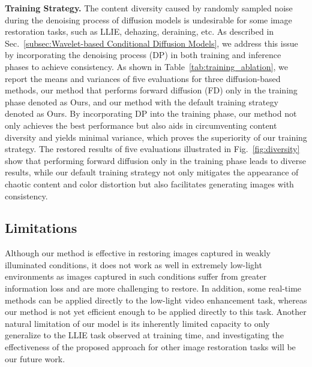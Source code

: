 \textbf{Training Strategy.}
The content diversity caused by randomly sampled noise during the denoising process of diffusion models is undesirable for some image restoration tasks, such as LLIE, dehazing, deraining, etc. As described in Sec.~\ref{subsec:Wavelet-based Conditional Diffusion Models}, we address this issue by incorporating the denoising process (DP) in both training and inference phases to achieve consistency. As shown in Table~\ref{tab:training_ablation}, we report the means and variances of five evaluations for three diffusion-based methods, our method that performs forward diffusion (FD) only in the training phase denoted as Ours, and our method with the default training strategy denoted as Ours. By incorporating DP into the training phase, our method not only achieves the best performance but also aids in circumventing content diversity and yields minimal variance, which proves the superiority of our training strategy. The restored results of five evaluations illustrated in Fig.~\ref{fig:diversity} show that performing forward diffusion only in the training phase leads to diverse results, while our default training strategy not only mitigates the appearance of chaotic content and color distortion but also facilitates generating images with consistency.

\subsection{Limitations}
Although our method is effective in restoring images captured in weakly illuminated conditions, it does not work as well in extremely low-light environments as images captured in such conditions suffer from greater information loss and are more challenging to restore. In addition, some real-time methods can be applied directly to the low-light video enhancement task, whereas our method is not yet efficient enough to be applied directly to this task. Another natural limitation of our model is its inherently limited capacity to only generalize to the LLIE task observed at training time, and investigating the effectiveness of the proposed approach for other image restoration tasks will be our future work.

